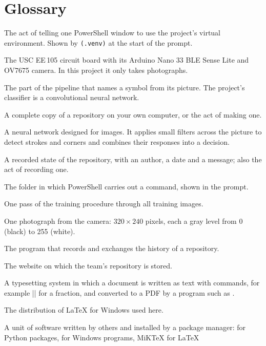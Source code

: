 \section{Glossary}
\label{sec:glossary}

\begin{description}[style=nextline,leftmargin=1.6em,itemsep=3pt]
\item[Activation] The act of telling one PowerShell window to use the project's virtual
  environment. Shown by \texttt{(.venv)} at the start of the prompt.
\item[Board] The USC EE\,105 circuit board with its Arduino Nano 33 BLE Sense Lite and OV7675
  camera. In this project it only takes photographs.
\item[Classifier] The part of the pipeline that names a symbol from its picture. The project's
  classifier is a convolutional neural network.
\item[Clone] A complete copy of a repository on your own computer, or the act of making one.
\item[CNN (convolutional neural network)] A neural network designed for images. It applies
  small filters across the picture to detect strokes and corners and combines their responses
  into a decision.
\item[Commit] A recorded state of the repository, with an author, a date and a message; also the
  act of recording one.
\item[Current folder] The folder in which PowerShell carries out a command, shown in the prompt.
\item[Epoch] One pass of the training procedure through all training images.
\item[Frame] One photograph from the camera: $320 \times 240$ pixels, each a gray level from 0
  (black) to 255 (white).
\item[Git] The program that records and exchanges the history of a repository.
\item[GitHub] The website on which the team's repository is stored.
\item[\LaTeX{}] A typesetting system in which a document is written as text with commands, for
  example \code|| for a fraction, and converted to a PDF by a program such as
  .
\item[MiKTeX] The distribution of \LaTeX{} for Windows used here.
\item[Package] A unit of software written by others and installed by a package manager:
   for Python packages,  for Windows programs, MiKTeX for \LaTeX{}

\end{description}
